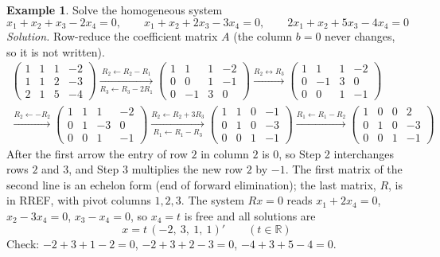 \documentclass[12pt]{article}
\newcommand{\R}{\mathbb R}
\theoremstyle{definition}
\newtheorem{example}[theorem]{Example}
\begin{document}
\begin{example}\label{r2-exm-gauss-jordan}
Solve the homogeneous system
\[
x_1+x_2+x_3-2x_4=0,\qquad x_1+x_2+2x_3-3x_4=0,\qquad 2x_1+x_2+5x_3-4x_4=0
\]
\textit{Solution.} Row-reduce the coefficient matrix \(A\) (the column \(b=0\) never changes,
so it is not written).
\[
\begin{gathered}
\begin{pmatrix}1&1&1&-2\\1&1&2&-3\\2&1&5&-4\end{pmatrix}
\xrightarrow[R_3\leftarrow R_3-2R_1]{R_2\leftarrow R_2-R_1}
\begin{pmatrix}1&1&1&-2\\0&0&1&-1\\0&-1&3&0\end{pmatrix}
\xrightarrow{R_2\leftrightarrow R_3}
\begin{pmatrix}1&1&1&-2\\0&-1&3&0\\0&0&1&-1\end{pmatrix}
\\
\xrightarrow{R_2\leftarrow-R_2}
\begin{pmatrix}1&1&1&-2\\0&1&-3&0\\0&0&1&-1\end{pmatrix}
\xrightarrow[R_1\leftarrow R_1-R_3]{R_2\leftarrow R_2+3R_3}
\begin{pmatrix}1&1&0&-1\\0&1&0&-3\\0&0&1&-1\end{pmatrix}
\xrightarrow{R_1\leftarrow R_1-R_2}
\begin{pmatrix}1&0&0&2\\0&1&0&-3\\0&0&1&-1\end{pmatrix}
\end{gathered}
\]
After the first arrow the entry of row \(2\) in column \(2\) is \(0\), so Step 2 interchanges
rows \(2\) and \(3\), and Step 3 multiplies the new row \(2\) by \(-1\). The first matrix of the
second line is an echelon form (end of forward elimination); the last matrix, \(R\), is in RREF,
with pivot columns \(1,2,3\). The system \(Rx=0\) reads \(x_1+2x_4=0\), \(x_2-3x_4=0\),
\(x_3-x_4=0\), so \(x_4=t\) is free and all solutions are
\[
x=t\,(-2,\ 3,\ 1,\ 1)'\qquad(t\in\R)
\]
Check: \(-2+3+1-2=0\), \(-2+3+2-3=0\), \(-4+3+5-4=0\).
\end{example}
\end{document}
